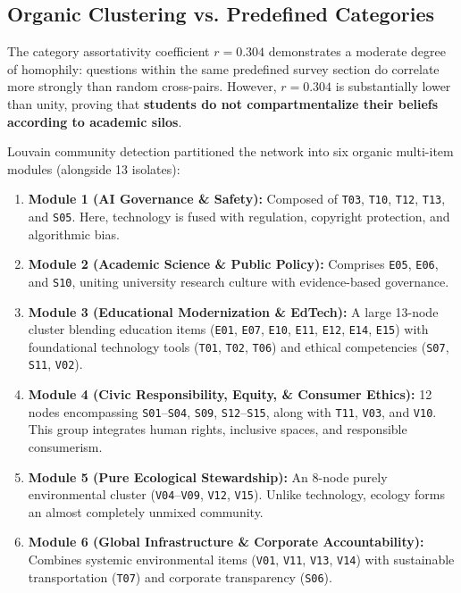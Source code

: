 \documentclass[11pt,a4paper]{article}
\begin{document}
\subsection{Organic Clustering vs. Predefined Categories}
The category assortativity coefficient $r = 0.304$ demonstrates a moderate degree of homophily: questions within the same predefined survey section do correlate more strongly than random cross-pairs. However, $r = 0.304$ is substantially lower than unity, proving that \textbf{students do not compartmentalize their beliefs according to academic silos}.

Louvain community detection partitioned the network into six organic multi-item modules (alongside 13 isolates):
\begin{enumerate}
    \item \textbf{Module 1 (AI Governance \& Safety):} Composed of \texttt{T03}, \texttt{T10}, \texttt{T12}, \texttt{T13}, and \texttt{S05}. Here, technology is fused with regulation, copyright protection, and algorithmic bias.
    \item \textbf{Module 2 (Academic Science \& Public Policy):} Comprises \texttt{E05}, \texttt{E06}, and \texttt{S10}, uniting university research culture with evidence-based governance.
    \item \textbf{Module 3 (Educational Modernization \& EdTech):} A large 13-node cluster blending education items (\texttt{E01}, \texttt{E07}, \texttt{E10}, \texttt{E11}, \texttt{E12}, \texttt{E14}, \texttt{E15}) with foundational technology tools (\texttt{T01}, \texttt{T02}, \texttt{T06}) and ethical competencies (\texttt{S07}, \texttt{S11}, \texttt{V02}).
    \item \textbf{Module 4 (Civic Responsibility, Equity, \& Consumer Ethics):} 12 nodes encompassing \texttt{S01}--\texttt{S04}, \texttt{S09}, \texttt{S12}--\texttt{S15}, along with \texttt{T11}, \texttt{V03}, and \texttt{V10}. This group integrates human rights, inclusive spaces, and responsible consumerism.
    \item \textbf{Module 5 (Pure Ecological Stewardship):} An 8-node purely environmental cluster (\texttt{V04}--\texttt{V09}, \texttt{V12}, \texttt{V15}). Unlike technology, ecology forms an almost completely unmixed community.
    \item \textbf{Module 6 (Global Infrastructure \& Corporate Accountability):} Combines systemic environmental items (\texttt{V01}, \texttt{V11}, \texttt{V13}, \texttt{V14}) with sustainable transportation (\texttt{T07}) and corporate transparency (\texttt{S06}).
\end{enumerate}
\end{document}

